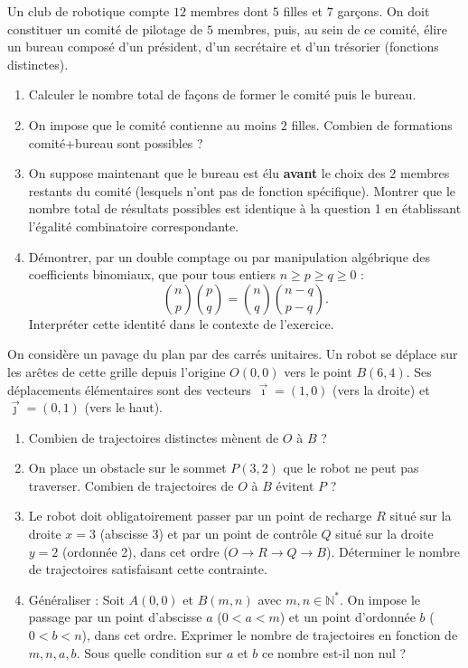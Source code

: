 \documentclass[11pt]{article}
\begin{document}
\begin{exercice}
Un club de robotique compte $12$ membres dont $5$ filles et $7$ garçons. On doit constituer un comité de pilotage de $5$ membres, puis, au sein de ce comité, élire un bureau composé d'un président, d'un secrétaire et d'un trésorier (fonctions distinctes).
\begin{enumerate}
    \item Calculer le nombre total de façons de former le comité puis le bureau.
    \item On impose que le comité contienne au moins $2$ filles. Combien de formations comité+bureau sont possibles ?
    \item On suppose maintenant que le bureau est élu \textbf{avant} le choix des $2$ membres restants du comité (lesquels n'ont pas de fonction spécifique). Montrer que le nombre total de résultats possibles est identique à la question 1 en établissant l'égalité combinatoire correspondante.
    \item Démontrer, par un double comptage ou par manipulation algébrique des coefficients binomiaux, que pour tous entiers $n \ge p \ge q \ge 0$ :
    \[
    \binom{n}{p}\binom{p}{q} = \binom{n}{q}\binom{n-q}{p-q}.
    \]
    Interpréter cette identité dans le contexte de l'exercice.
\end{enumerate}
\end{exercice}

\begin{exercice}
On considère un pavage du plan par des carrés unitaires. Un robot se déplace sur les arêtes de cette grille depuis l'origine $O(0,0)$ vers le point $B(6,4)$. Ses déplacements élémentaires sont des vecteurs $\vec{\imath}=(1,0)$ (vers la droite) et $\vec{\jmath}=(0,1)$ (vers le haut).
\begin{enumerate}
    \item Combien de trajectoires distinctes mènent de $O$ à $B$ ?
    \item On place un obstacle sur le sommet $P(3,2)$ que le robot ne peut pas traverser. Combien de trajectoires de $O$ à $B$ évitent $P$ ?
    \item Le robot doit obligatoirement passer par un point de recharge $R$ situé sur la droite $x=3$ (abscisse 3) et par un point de contrôle $Q$ situé sur la droite $y=2$ (ordonnée 2), dans cet ordre ($O \to R \to Q \to B$). Déterminer le nombre de trajectoires satisfaisant cette contrainte.
    \item Généraliser : Soit $A(0,0)$ et $B(m,n)$ avec $m,n \in \mathbb{N}^*$. On impose le passage par un point d'abscisse $a$ ($0 < a < m$) et un point d'ordonnée $b$ ($0 < b < n$), dans cet ordre. Exprimer le nombre de trajectoires en fonction de $m,n,a,b$. Sous quelle condition sur $a$ et $b$ ce nombre est-il non nul ?
\end{enumerate}
\end{exercice}
\end{document}
